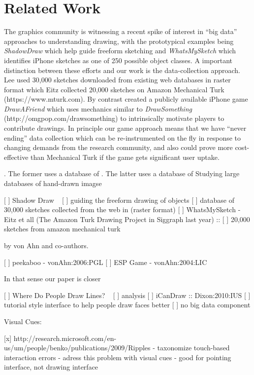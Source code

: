 \section{Related Work}

The graphics community is witnessing a recent spike of interest in
``big data'' approaches to understanding drawing, with the
prototypical examples being \emph{ShadowDraw} \cite{Lee:2011} which
help guide freeform sketching and \emph{WhatsMySketch}
\cite{Eitz:2012:HSO} which identifies iPhone sketches as one of 250
possible object classes. A important distinction between these
efforts and our work is the data-collection approach. Lee \etal used
30,000 sketches downloaded from existing web databases in raster
format which Eitz \etal collected 20,000 sketches on Amazon
Mechanical Turk (https://www.mturk.com). By contrast created a
publicly available iPhone game \emph{DrawAFriend} which uses
mechanics similar to \emph{DrawSomething}
(http://omgpop.com/drawsomething) to intrinsically motivate players
to contribute drawings. In principle our game approach means that we
have ``never ending'' data collection which can be re-instrumented
on the fly in response to changing demands from the research
community, and also could prove more cost-effective than Mechanical
Turk if the game gets significant user uptake.


. The former uses a database of  . The latter uses a
database of 
Studying large databases of hand-drawn imagse

[ ] Shadow Draw ~\cite{}
	[ ] guiding the freeform drawing of objects
	[ ] database of 30,000 sketches collected from the web in (raster format)
[ ] WhatsMySketch - Eitz et all (The Amazon Turk Drawing Project in Siggraph last year) :: \cite{}
	[ ] 20,000 sketches from amazon mechanical turk

by von Ahn and co-authors. 

[ ] peekaboo - vonAhn:2006:PGL
[ ] ESP Game - vonAhn:2004:LIC

In that sense our paper is closer 

[ ] Where Do People Draw Lines? ~\cite{Cole:2008:WDP}
	[ ] analysis 
[ ] iCanDraw :: Dixon:2010:IUS
	[ ] tutorial style interface to help people draw faces better
		[ ] no big data component

Visual Cues:

[x] http://research.microsoft.com/en-us/um/people/benko/publications/2009/Ripples%
	- taxonomize touch-based interaction errors
	- adress this problem with visual cues
	- good for pointing interface, not drawing interface


